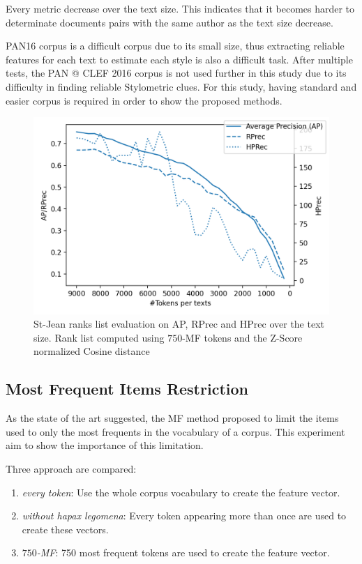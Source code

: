 Every metric decrease over the text size.
This indicates that it becomes harder to determinate documents pairs with the same author as the text size decrease.

PAN16 corpus is a difficult corpus due to its small size, thus extracting reliable features for each text to estimate each style is also a difficult task.
After multiple tests, the PAN @ CLEF 2016 corpus is not used further in this study due to its difficulty in finding reliable Stylometric clues.
For this study, having standard and easier corpus is required in order to show the proposed methods.

\begin{figure}
  \centering
  \caption{St-Jean ranks list evaluation on AP, RPrec and HPrec over the text size. Rank list computed using $750$-MF tokens and the Z-Score normalized Cosine distance}
  \label{fig:degradation}
  \includegraphics[width=\linewidth]{img/degradation.png}
\end{figure}

\subsection{Most Frequent Items Restriction \label{sec:influance_mf_restriction}}

As the state of the art suggested, the MF method proposed to limit the items used to only the most frequents in the vocabulary of a corpus.
This experiment aim to show the importance of this limitation.

Three approach are compared:
\begin{enumerate}
  \item
  \textit{every token}: Use the whole corpus vocabulary to create the feature vector.
  \item
  \textit{without hapax legomena}: Every token appearing more than once are used to create these vectors.
  \item
  \textit{$750$-MF}: 750 most frequent tokens are used to create the feature vector.
\end{enumerate}

